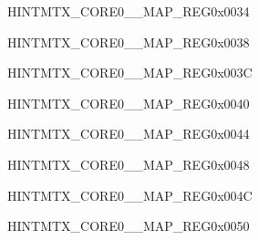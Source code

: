 

\begin{register}{H}{INTMTX\_CORE0\_\_MAP\_REG}{0x0034}\label{regdesc:INTMTXCORE0PMUINTRMAPREG}
\end{register}\vspace{-3em}


\begin{register}{H}{INTMTX\_CORE0\_\_MAP\_REG}{0x0038}\label{regdesc:INTMTXCORE0EFUSEINTRMAPREG}
\end{register}\vspace{-3em}


\begin{register}{H}{INTMTX\_CORE0\_\_MAP\_REG}{0x003C}\label{regdesc:INTMTXCORE0LPRTCTIMERINTRMAPREG}
\end{register}\vspace{-3em}




\begin{register}{H}{INTMTX\_CORE0\_\_MAP\_REG}{0x0040}\label{regdesc:INTMTXCORE0LPUARTINTRMAPREG}
\end{register}\vspace{-3em}


\begin{register}{H}{INTMTX\_CORE0\_\_MAP\_REG}{0x0044}\label{regdesc:INTMTXCORE0LPI2CINTRMAPREG}
\end{register}\vspace{-3em}


\begin{register}{H}{INTMTX\_CORE0\_\_MAP\_REG}{0x0048}\label{regdesc:INTMTXCORE0LPWDTINTRMAPREG}
\end{register}\vspace{-3em}


\begin{register}{H}{INTMTX\_CORE0\_\_MAP\_REG}{0x004C}\label{regdesc:INTMTXCORE0LPPERITIMEOUTINTRMAPREG}
\end{register}\vspace{-3em}


\begin{register}{H}{INTMTX\_CORE0\_\_MAP\_REG}{0x0050}\label{regdesc:INTMTXCORE0LPAPMM0INTRMAPREG}
\end{register}\vspace{-3em}



